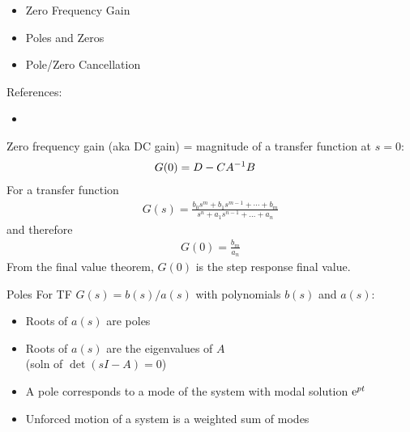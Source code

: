 \documentclass{beamer-control}
\begin{document}

\begin{SUMMARY}
\begin{itemize}
\item Zero Frequency Gain
\item Poles and Zeros
\item Pole/Zero Cancellation
\end{itemize}
\vfill References:
\begin{itemize}
\item {}
\end{itemize}
\end{SUMMARY}




\begin{frame}
Zero frequency gain (aka \alert{DC gain}) = magnitude of a transfer function at $s=0$:
\begin{align}
G(0) &= D - CA^{-1} B
\end{align}
For a transfer function
\begin{align}
G(s) = \frac{b_0 s^m + b_1 s^{m-1} + \cdots + b_m}{s^n + a_1 s^{n-1} + \dots + a_n}
\end{align}
and therefore
\begin{align}
G(0) = \frac{b_m}{a_n}
\end{align}
From the final value theorem, $G(0)$ is the step response final value.
\end{frame}



\begin{frame}{Poles}
For TF $G(s) = b(s)/a(s)$ with polynomials $b(s)$ and $a(s)$:
\begin{itemize}
\item Roots of $a(s)$ are \alert{poles}
\item Roots of $a(s)$ are the eigenvalues of $A$ \\(soln of $\det(sI-A)=0$)
\item A pole corresponds to a mode of the system with modal solution $\mathrm{e}^{pt}$
\item Unforced motion of a system is a weighted sum of modes
\end{itemize}
\end{frame}
\end{document}
